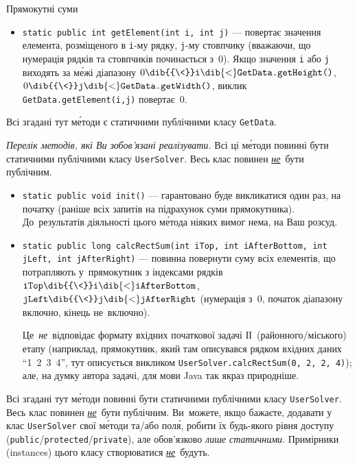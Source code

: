 \begin{problemAllDefault}{Прямокутні суми}
\begin{itemize}
\item
\texttt{static public int getElement(int~i, int~j)} --- повертає значення елемента, розміщеного в \texttt{i}-му рядку, \texttt{j}-му стовпчику (вважаючи, що нумерація рядків та стовпчиків починається з~0). Якщо значення \texttt{i} або \texttt{j} виходять за м\'{е}жі діапазону 
$0\dib{{\<}}\texttt{i}\dib{{<}}\texttt{GetData.getHeight()}$,
$0\dib{{\<}}\texttt{j}\dib{{<}}\texttt{GetData.getWidth()}$,
виклик \texttt{GetData.getElement(i,j)} повертає~0.
\end{itemize}
Всі згадані тут м\'{е}тоди є статичними публічними класу \texttt{GetData}. 

\medskip
\noindent\emph{Перелік методів, які Ви зобов'язані реалізувати.}
Всі ці м\'{е}тоди повинні бути статичними публічними класу \texttt{UserSolver}. Весь клас повинен \underline{\emph{не}}~бути публічним.
\begin{itemize}
\item
\texttt{static public void init()} --- гарантовано буде викликатися один раз, на початку (раніше всіх запитів на підрахунок суми прямокутника). До~результатів діяльності цього м\'{е}тода ніяких вимог нема, на Ваш розсуд.
\item
\texttt{static public long calcRectSum(int iTop, int iAfterBottom, int jLeft, int jAfterRight)} --- повинна повернути суму всіх елементів, що потрапляють у~прямокутник з індексами рядків 
$\texttt{iTop}\dib{{\<}}\texttt{i}\dib{{<}}\texttt{iAfterBottom}$,
$\texttt{jLeft}\dib{{\<}}\texttt{j}\dib{{<}}\texttt{jAfterRight}$
(нумерація з~0, початок діапазону включно, кінець не~включно).

Це~\emph{не}~відповідає формату вхідних початкової задачі ІІ~(районного/\nolinebreak[2]міського) етапу (наприклад, прямокутник, який там описувався рядком вхідних даних ``1~2~3~4'', тут описується викликом \texttt{UserSolver.calcRectSum(0,~2,~2,~4)}); але, на думку автора задачі, для мови Java так якраз природніше.

\end{itemize}
Всі згадані тут м\'{е}тоди повинні бути статичними публічними класу \texttt{UserSolver}.
Весь клас повинен \underline{\emph{не}}~бути публічним. Ви~можете, якщо бажаєте, додавати у клас \texttt{UserSolver} свої м\'{е}тоди та/або пол\'{я}, робити їх будь-якого рівня доступу (\texttt{public}/\nolinebreak[2]\texttt{protected}/\nolinebreak[2]\texttt{private}), але обов'язково \emph{лише статичними}. Примірники (instances) цього класу створюватися \underline{\emph{не}}~будуть.



\end{problemAllDefault}
